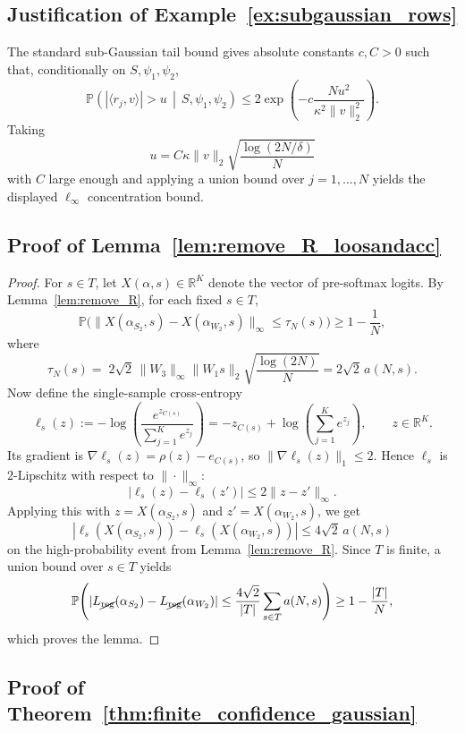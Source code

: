 \documentclass[11pt]{article}
\theoremstyle{plain}
\theoremstyle{definition}
\theoremstyle{remark}
\newcommand{\R}{\mathbb{R}}
\newcommand{\PP}{\mathbb{P}}
\newcommand{\1}{\mathbf{1}}
\begin{document}
\subsection{Justification of Example~\ref{ex:subgaussian_rows}}

The standard sub-Gaussian tail bound gives absolute constants \(c,C>0\) such that, conditionally on \(S,\psi_1,\psi_2\),
\[
\PP\!\left(
|\langle r_j,v\rangle|>u
\,\middle|\,S,\psi_1,\psi_2
\right)
\le
2\exp\!\left(-c\frac{Nu^2}{\kappa^2\|v\|_2^2}\right).
\]
Taking
\[
u=C\kappa\|v\|_2\sqrt{\frac{\log(2N/\delta)}{N}}
\]
with \(C\) large enough and applying a union bound over \(j=1,\dots,N\) yields the displayed \(\ell_\infty\) concentration bound.

\subsection{Proof of Lemma~\ref{lem:remove_R_loosandacc}}

\begin{proof}
For \(s\in T\), let \(X(\alpha,s)\in\R^K\) denote the vector of pre-softmax logits. By Lemma~\ref{lem:remove_R}, for each fixed \(s\in T\),
\[
\PP\Big(
\|X(\alpha_{S_2},s)-X(\alpha_{W_2},s)\|_\infty\le \tau_N(s)
\Big)
\ge
1-\frac{1}{N},
\]
where
\[
\tau_N(s)
=
\;2\sqrt{2}\,\|W_3\|_\infty\|W_1s\|_2\sqrt{\frac{\log(2N)}{N}}
=2\sqrt{2}\,a(N,s).
\]
Now define the single-sample cross-entropy
\[
\ell_s(z):=
-\log\!\left(\frac{e^{z_{C(s)}}}{\sum_{j=1}^{K}e^{z_j}}\right)
=
-z_{C(s)}+\log\!\left(\sum_{j=1}^{K}e^{z_j}\right),
\qquad z\in\R^K.
\]
Its gradient is \(\nabla \ell_s(z)=\rho(z)-e_{C(s)}\), so \(\|\nabla \ell_s(z)\|_1\le 2\). Hence \(\ell_s\) is \(2\)-Lipschitz with respect to \(\|\cdot\|_\infty\):
\[
|\ell_s(z)-\ell_s(z')|\le 2\|z-z'\|_\infty.
\]
Applying this with \(z=X(\alpha_{S_2},s)\) and \(z'=X(\alpha_{W_2},s)\), we get
\[
|\ell_s(X(\alpha_{S_2},s))-\ell_s(X(\alpha_{W_2},s))|
\le
4\sqrt{2}\,a(N,s)
\]
on the high-probability event from Lemma~\ref{lem:remove_R}. Since \(T\) is finite, a union bound over \(s\in T\) yields
\[
\PP\!\left(
|L_{\cancel{\mathrm{reg}}}(\alpha_{S_2})-L_{\cancel{\mathrm{reg}}}(\alpha_{W_2})|
\le
\frac{4\sqrt{2}}{|T|}\sum_{s\in T}a(N,s)
\right)
\ge
1-\frac{|T|}{N},
\]
which proves the lemma.
\end{proof}

\subsection{Proof of Theorem~\ref{thm:finite_confidence_gaussian}}
\end{document}
